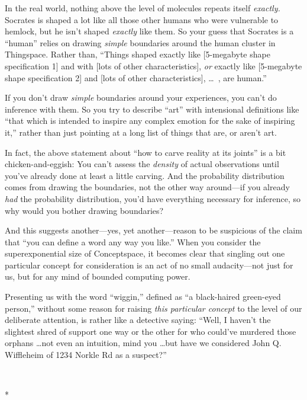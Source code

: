 {
 In the real world, nothing above the level of molecules repeats
itself \textit{exactly.} Socrates is shaped a lot like all those other
humans who were vulnerable to hemlock, but he isn't
shaped \textit{exactly} like them. So your guess that Socrates is a
``human'' relies on drawing
\textit{simple} boundaries around the human cluster in Thingspace.
Rather than, ``Things shaped exactly like [5-megabyte
shape specification 1] and with [lots of other characteristics],
\textit{or} exactly like [5-megabyte shape specification 2] and [lots
of other characteristics], \ldots~, are human.''}

{
 If you don't draw \textit{simple} boundaries
around your experiences, you can't do inference with
them. So you try to describe ``art''
with intensional definitions like ``that which is
intended to inspire any complex emotion for the sake of inspiring
it,'' rather than just pointing at a long list of
things that are, or aren't art.}

{
 In fact, the above statement about ``how to carve
reality at its joints'' is a bit chicken-and-eggish:
You can't assess the \textit{density} of actual
observations until you've already done at least a
little carving. And the probability distribution comes from drawing the
boundaries, not the other way around---if you already \textit{had} the
probability distribution, you'd have everything
necessary for inference, so why would you bother drawing boundaries?}

{
 And this suggests another---yes, yet another---reason to be
suspicious of the claim that ``you can define a word
any way you like.'' When you consider the
superexponential size of Conceptspace, it becomes clear that singling
out one particular concept for consideration is an act of no small
audacity---not just for us, but for any mind of bounded computing
power.}

{
 Presenting us with the word
``wiggin,'' defined as
``a black-haired green-eyed
person,'' without some reason for raising
\textit{this particular concept} to the level of our deliberate
attention, is rather like a detective saying: ``Well,
I haven't the slightest shred of support one way or the
other for who could've murdered those orphans \ldots not
even an intuition, mind you \ldots but have we considered John Q.
Wiffleheim of 1234 Norkle Rd as a suspect?''}

{\centering
 \ ~
\par}

{\centering
 *
\par}


